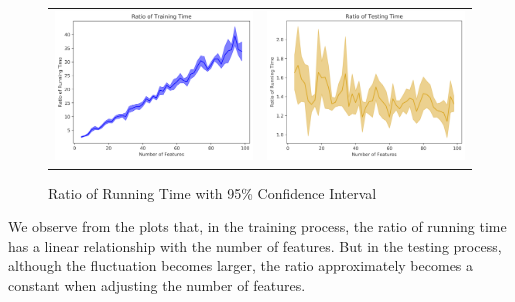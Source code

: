 \documentclass[twoside,11pt]{article}
\begin{document}
\begin{figure}[h]
\begin{tabular}{ll}
\includegraphics[scale=0.4]{Figures/simulation/training.png}
&
\includegraphics[scale=0.4]{Figures/simulation/testing.png}
\end{tabular}
\caption{Ratio of Running Time with 95\% Confidence Interval}
\label{running_time_ratio}
\end{figure}

We observe from the plots that, in the training process, the ratio of running time has a linear relationship with the number of features. But in the testing process, although the fluctuation becomes larger, the ratio approximately becomes a constant when adjusting the number of features. 
\end{document}
